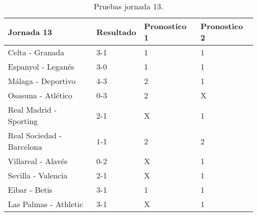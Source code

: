  \begin{table}
  \begin{center}
   \begin{tabular}{|p{5cm} | p{2.5cm} |p{2.5cm} |p{2.5cm} |}
    \hline
   	Jornada 13 & Resultado & Pronostico 1 & Pronostico 2\\
    \hline
    Celta - Granada & 3-1 & \cellcolor{green}1 & \cellcolor{green}1\\
    \hline
    Espanyol - Leganés & 3-0 & \cellcolor{green}1 & \cellcolor{green}1\\
    \hline
    Málaga - Deportivo & 4-3 & \cellcolor{red}2 & \cellcolor{green}1\\
    \hline
    Osasuna - Atlético & 0-3 & \cellcolor{green}2 & \cellcolor{red}X\\
    \hline
    Real Madrid - Sporting & 2-1 & \cellcolor{red}X & \cellcolor{green}1\\
    \hline
    Real Sociedad - Barcelona & 1-1 & \cellcolor{red}2 & \cellcolor{red}2\\
    \hline
    Villareal - Alavés & 0-2 & \cellcolor{red}X & \cellcolor{red}1\\
    \hline
	Sevilla - Valencia & 2-1 & \cellcolor{red}X & \cellcolor{green}1\\
    \hline
	Eibar - Betis & 3-1 & \cellcolor{green}1 & \cellcolor{green}1\\
    \hline
    Las Palmas - Athletic & 3-1 & \cellcolor{red}X & \cellcolor{red}1\\
    \hline
   \end{tabular}
   \caption{Pruebas jornada 13.}
   \label{tabla:jornada13}
  \end{center}
 \end{table} 
 
